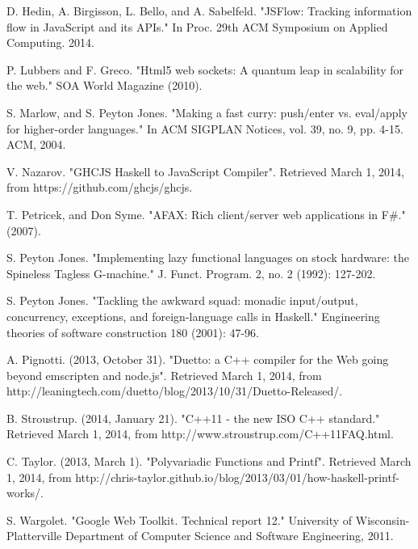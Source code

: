 \documentclass[preprint]{sigplanconf}
\begin{document}
\begin{thebibliography}{}
D. Hedin, A. Birgisson, L. Bello, and A. Sabelfeld. "JSFlow: Tracking information flow in JavaScript and its APIs." In Proc. 29th ACM Symposium on Applied Computing. 2014.

P. Lubbers and F. Greco. "Html5 web sockets: A quantum leap in scalability for the web." SOA World Magazine (2010).

S. Marlow, and S. Peyton Jones. "Making a fast curry: push/enter vs. eval/apply for higher-order languages." In ACM SIGPLAN Notices, vol. 39, no. 9, pp. 4-15. ACM, 2004.

V. Nazarov. "GHCJS Haskell to JavaScript Compiler". Retrieved March 1, 2014, from https://github.com/ghcjs/ghcjs.

T. Petricek, and Don Syme. "AFAX: Rich client/server web applications in F\#." (2007).

S. Peyton Jones. "Implementing lazy functional languages on stock hardware: the Spineless Tagless G-machine." J. Funct. Program. 2, no. 2 (1992): 127-202.

S. Peyton Jones. "Tackling the awkward squad: monadic input/output, concurrency, exceptions, and foreign-language calls in Haskell." Engineering theories of software construction 180 (2001): 47-96.

A. Pignotti. (2013, October 31). "Duetto: a C++ compiler for the Web going beyond emscripten and node.js". Retrieved March 1, 2014, from http://leaningtech.com/duetto/blog/2013/10/31/Duetto-Released/.

B. Stroustrup. (2014, January 21). "C++11 - the new ISO C++ standard." Retrieved March 1, 2014, from http://www.stroustrup.com/C++11FAQ.html.

C. Taylor. (2013, March 1). "Polyvariadic Functions and Printf". Retrieved March 1, 2014, from http://chris-taylor.github.io/blog/2013/03/01/how-haskell-printf-works/.

S. Wargolet. "Google Web Toolkit. Technical report 12." University of Wisconsin-Platterville Department of Computer Science and Software Engineering, 2011.

\end{thebibliography}
\end{document}
